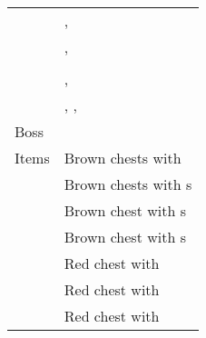 \begin{longtable}{ l p{9cm} }
	& \nameref{monster:gorgon}, \nameref{monster:skeleton} \\
	& \nameref{monster:gorgon}, \nameref{monster:sand_worm} \\
	\nameref{monster:minotaur_zombie}
	& \nameref{monster:minotaur_zombie} \\
	& \nameref{monster:minotaur_zombie}, \nameref{monster:basilisk} \\
	& \nameref{monster:minotaur_zombie}, \nameref{monster:basilisk}, \nameref{monster:skeleton}
\\
	Boss & \nameref{monster:flamerus_rex}
\\
	Items
	& Brown chests with \nameref{weapon:ninja_stars} \\
	& Brown chests with \nameref{item:cure_potion}s \\
	& Brown chest with \nameref{weapon:bomb}s \\
	& Brown chest with \nameref{item:seed}s \\
	& Red chest with \nameref{spell:quake} \\
	& Red chest with \nameref{item:sand_coin} \\
	& Red chest with \nameref{armor:steel_shield}
\end{longtable}
